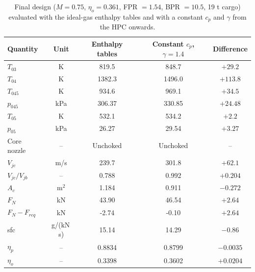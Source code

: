 \begin{table}[H]
\centering
\begin{tabular}{l c c c c}
\toprule
Quantity & Unit & Enthalpy tables & Constant $c_p$, $\gamma = 1.4$ & Difference \\
\midrule
$T_{03}$          & K          & 819.5    & 848.7    & $+29.2$   \\
$T_{04}$          & K          & 1382.3   & 1496.0   & $+113.8$  \\
$T_{045}$         & K          & 934.6    & 969.1    & $+34.5$   \\
$p_{045}$         & kPa        & 306.37   & 330.85   & $+24.48$  \\
$T_{05}$          & K          & 532.1    & 534.2    & $+2.2$    \\
$p_{05}$          & kPa        & 26.27    & 29.54    & $+3.27$   \\
Core nozzle       & --         & Unchoked & Unchoked & --        \\
$V_{jc}$          & m/s        & 239.7    & 301.8    & $+62.1$   \\
$V_{jc}/V_{jb}$   & --         & 0.788    & 0.992    & $+0.204$  \\
$A_c$             & m$^2$      & 1.184    & 0.911    & $-0.272$  \\
$F_N$             & kN         & 43.90    & 46.54    & $+2.64$   \\
$F_N - F_{req}$   & kN         & -2.74    & -0.10    & $+2.64$   \\
sfc               & g/(kN\,s)  & 15.14    & 14.29    & $-0.86$   \\
$\eta_p$          & --         & 0.8834   & 0.8799   & $-0.0035$ \\
$\eta_o$          & --         & 0.3398   & 0.3602   & $+0.0204$ \\
\bottomrule
\end{tabular}
\caption{Final design ($M = 0.75$, $\eta_o = 0.361$, FPR $= 1.54$, BPR $= 10.5$, 19 t cargo) evaluated
with the ideal-gas enthalpy tables and with a constant $c_p$ and $\gamma$ from the HPC onwards.}
\label{tab:final_cp_comparison}
\end{table}
